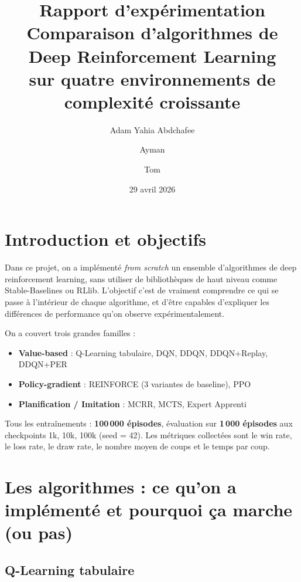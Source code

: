 \documentclass[12pt,a4paper]{article}
\title{
  \textbf{Rapport d'expérimentation}\\[0.5em]
  \large Comparaison d'algorithmes de Deep Reinforcement Learning\\
  sur quatre environnements de complexité croissante
}
\author{Adam Yahia Abdchafee \and Ayman \and Tom}
\date{29 avril 2026}
\begin{document}
\maketitle
\tableofcontents
\newpage

\section{Introduction et objectifs}

Dans ce projet, on a implémenté \textit{from scratch} un ensemble d'algorithmes de deep reinforcement learning, sans utiliser de bibliothèques de haut niveau comme Stable-Baselines ou RLlib. L'objectif c'est de vraiment comprendre ce qui se passe à l'intérieur de chaque algorithme, et d'être capables d'expliquer les différences de performance qu'on observe expérimentalement.

On a couvert trois grandes familles :
\begin{itemize}
  \item \textbf{Value-based} : Q-Learning tabulaire, DQN, DDQN, DDQN+Replay, DDQN+PER
  \item \textbf{Policy-gradient} : REINFORCE (3 variantes de baseline), PPO
  \item \textbf{Planification / Imitation} : MCRR, MCTS, Expert Apprenti
\end{itemize}

Tous les entraînements : \textbf{100\,000 épisodes}, évaluation sur \textbf{1\,000 épisodes} aux checkpoints 1k, 10k, 100k (seed = 42). Les métriques collectées sont le win rate, le loss rate, le draw rate, le nombre moyen de coups et le temps par coup.

\section{Les algorithmes : ce qu'on a implémenté et pourquoi ça marche (ou pas)}

\subsection{Q-Learning tabulaire}
\end{document}
